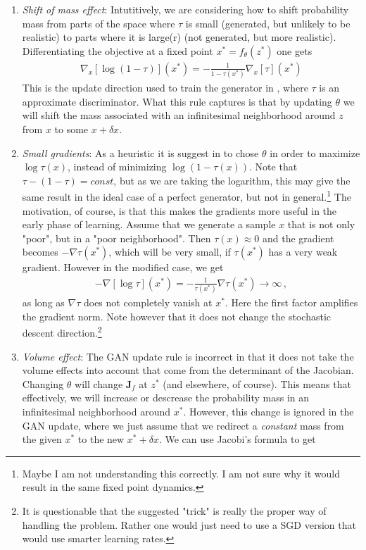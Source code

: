 \documentclass{article}
\newcommand{\J}{{\mathbf J}}
\begin{document}
\begin{enumerate}
% 
\item \textit{Shift of mass effect}: 
%
Intutitively, we are considering how to shift probability mass from parts of the space where $\tau$ is small (generated, but unlikely to be realistic) to parts where it is large(r) (not generated, but more realistic). Differentiating the objective  at a fixed point $x^*=f_\theta(z^*)$ one gets
\begin{align}
\nabla_x [\log (1-\tau)](x^*)  = - \frac{1}{1-\tau(x^*)} \nabla_x [\tau](x^*)
\end{align}
This is the update direction used to train the generator in \cite{goodfellow2014generative}, where $\tau$ is an approximate discriminator. What this rule captures is that by updating $\theta$ we will shift the mass associated with an infinitesimal neighborhood around $z$ from $x$ to some $x + \delta x$. 
%
\item \textit{Small gradients}: 
% 
As a heuristic it is suggest in  \cite{goodfellow2014generative}  to chose $\theta$ in order to maximize $\log \tau(x)$, instead of minimizing $\log (1-\tau(x))$. Note that $\tau - (1-\tau) = const$, but as we are taking the logarithm, this may give the same result in the ideal case of a perfect generator, but not in general.\footnote{Maybe I am not understanding this correctly. I am not sure why it would result in the same fixed point dynamics.} The motivation, of course, is that this makes the gradients more useful in the early phase of learning. Assume that we generate a sample $x$ that is not only "poor", but in a "poor neighborhood". Then $\tau(x) \approx 0$ and the gradient becomes $-\nabla \tau(x^*)$, which will be very small, if $\tau(x^*)$ has a very weak gradient. However in the modified case, we get
\begin{align}
-\nabla[\log \tau](x^*) =-\frac{1}{\tau(x^*)} \nabla \tau(x^*) \to \infty\,,
\end{align}
as long as $\nabla \tau$ does not completely vanish at $x^*$. Here the first factor amplifies the gradient norm. Note however that it does not change the stochastic descent direction.\footnote{It is questionable that the suggested "trick" is really the proper way of handling the problem. Rather one would just need to use a SGD version that would use smarter learning rates.}
%
\item \textit{Volume effect}: 
%
The GAN update rule is incorrect in that it does not take the volume effects into account that come from the determinant of the Jacobian.  Changing $\theta$ will change $\J_f$ at $z^*$ (and elsewhere, of course). This means that effectively, we will increase or descrease the probability mass in an infinitesimal neighborhood around $x^*$. However, this change is ignored in the GAN update, where we just assume that we redirect a \textit{constant} mass from the given $x^*$  to the new $x^* + \delta x$. We can use Jacobi's formula to get 

\end{enumerate}
\end{document}
